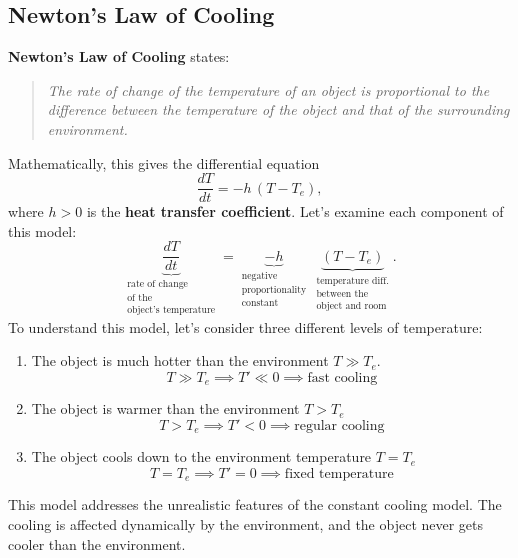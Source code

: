 \documentclass[10pt,letterpaper]{article}
\begin{document}
\subsection{Newton’s Law of Cooling}

\textbf{Newton’s Law of Cooling} states:

\begin{quote}
\textit{The rate of change of the temperature of an object is proportional to the difference between the temperature of the object and that of the surrounding environment.}
\end{quote}
Mathematically, this gives the differential equation
\[
\boxed{
\frac{dT}{dt} = -h\,(T - T_e),
}
\]
where $h>0$ is the \textbf{heat transfer coefficient}. Let's examine each component of this model:
\[
\underbrace{\frac{dT}{dt}}_{
  \begin{array}{c}
    \text{rate of change }\\
    \text{of the}\\
    \text{object's temperature}
  \end{array}
}
=
\underbrace{-h}_{
  \begin{array}{c}
    \text{negative}\\
    \text{proportionality}\\
    \text{constant}
  \end{array}
}
\,\underbrace{(T-T_e)}_{
  \begin{array}{c}
    \text{temperature diff.}\\
    \text{between the}\\
    \text{object and room}
  \end{array}
}.
\]
To understand this model, let's consider three different levels of temperature:
\begin{enumerate}
    \item The object is much hotter than the environment $T\gg T_e$. 
        $$T\gg T_e \implies T'\ll 0\implies \text{fast cooling}$$
    \item The object is warmer than the environment $T > T_e$
        $$ T >T_e \implies T'<0 \implies \text{regular cooling}$$
    \item The object cools down to the environment temperature $T=T_e$
    $$ T = T_e \implies T'=0\implies \text{fixed temperature}$$
\end{enumerate}
This model addresses the unrealistic features of the constant cooling model. The cooling is affected dynamically by the environment, and the object never gets cooler than the environment.
\end{document}
